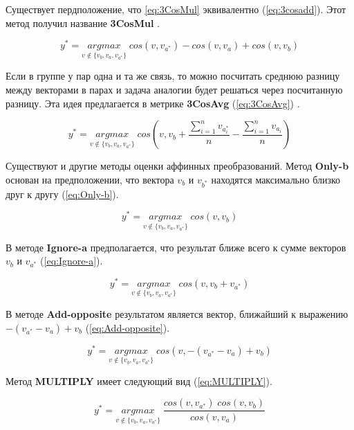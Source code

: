 \documentclass[a4paper,14pt]{article}
\begin{document}
Существует пердположение, что \ref{eq:3CosMul} эквивалентно (\ref{eq:3cosadd}). Этот метод получил название \textbf{3CosMul} \cite{21}.

\begin{equation}
	y^* = \underset{v \notin \{v_b, v_a, v_{a^*}\}}{argmax} \; cos(v, v_{a^*}) - cos(v, v_a) + cos(v, v_b)
	\label{eq:3CosMul}
\end{equation}

Если в группе у пар одна и та же связь, то можно посчитать среднюю разницу между векторами в парах и задача аналогии будет решаться через посчитанную разницу.
Эта идея предлагается в метрике	\textbf{3CosAvg} (\ref{eq:3CosAvg}) \cite{28}.

\begin{equation}
	y^* = \underset{v \notin \{v_b, v_a, v_{a^*}\}}{argmax} \; cos(v,v_b + \dfrac{\sum_{i=1}^{n}v_{a_i^*}}{n} - \dfrac{\sum_{i=1}^{n}v_{a_i}}{n})
	\label{eq:3CosAvg}
\end{equation}

Существуют и другие методы оценки аффинных преобразований.
Метод \textbf{Only-b} \cite{27} основан на предположении, что вектора $v_b$ и $v_{b^*}$ находятся максимально близко друг к другу (\ref{eq:Only-b}).

\begin{equation}
	y^* = \underset{v \notin \{v_b, v_a, v_{a^*}\}}{argmax} \; cos(v, v_b)
	\label{eq:Only-b}
\end{equation}

В методе \textbf{Ignore-a} \cite{27} предполагается, что результат ближе всего к сумме векторов $v_b$ и $v_{a^*}$ (\ref{eq:Ignore-a}).

\begin{equation}
	y^* = \underset{v \notin \{v_b, v_a, v_{a^*}\}}{argmax} \; cos(v, v_b + v_{a^*})
	\label{eq:Ignore-a}
\end{equation}

В методе \textbf{Add-opposite} \cite{27} результатом является вектор, ближайший к выражению $-(v_{a^*} - v_a) + v_b$ (\ref{eq:Add-opposite}).

\begin{equation}
	y^* = \underset{v \notin \{v_b, v_a, v_{a^*}\}}{argmax} \; cos(v, -(v_{a^*} - v_a) + v_b)
	\label{eq:Add-opposite}
\end{equation}

Метод \textbf{MULTIPLY} \cite{27} имеет следующий вид (\ref{eq:MULTIPLY}).

\begin{equation}
	y^* = \underset{v \notin \{v_b, v_a, v_{a^*}\}}{argmax} \; \dfrac{cos(v, v_{a^*}) \; cos(v, v_b)}{cos(v, v_a)}
	\label{eq:MULTIPLY}
\end{equation}
\end{document}
